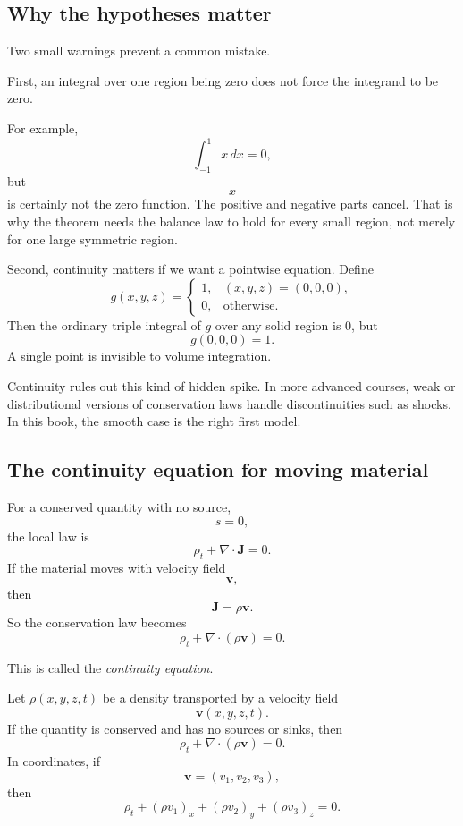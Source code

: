 \subsection{Why the hypotheses matter}

Two small warnings prevent a common mistake.

First, an integral over one region being zero does not force the integrand to be zero.

For example,
\[
    \int_{-1}^{1} x\,dx=0,
\]
but
\[
    x
\]
is certainly not the zero function.  The positive and negative parts cancel.  That is why
the theorem needs the balance law to hold for every small region, not merely for one
large symmetric region.

Second, continuity matters if we want a pointwise equation.  Define
\[
    g(x,y,z)=
    \begin{cases}
    1, & (x,y,z)=(0,0,0),\\
    0, & \text{otherwise}.
    \end{cases}
\]
Then the ordinary triple integral of \(g\) over any solid region is \(0\), but
\[
    g(0,0,0)=1.
\]
A single point is invisible to volume integration.

Continuity rules out this kind of hidden spike.  In more advanced courses, weak or
distributional versions of conservation laws handle discontinuities such as shocks.  In
this book, the smooth case is the right first model.

\subsection{The continuity equation for moving material}

For a conserved quantity with no source,
\[
    s=0,
\]
the local law is
\[
\boxed{
    \rho_t+\nabla\cdot\mathbf J=0.
}
\]
If the material moves with velocity field
\[
    \mathbf v,
\]
then
\[
    \mathbf J=\rho\mathbf v.
\]
So the conservation law becomes
\[
\boxed{
    \rho_t+\nabla\cdot(\rho\mathbf v)=0.
}
\]

This is called the \emph{continuity equation}.

\begin{definition}
Let \(\rho(x,y,z,t)\) be a density transported by a velocity field
\[
    \mathbf v(x,y,z,t).
\]
If the quantity is conserved and has no sources or sinks, then
\[
\boxed{
    \rho_t+\nabla\cdot(\rho\mathbf v)=0.
}
\]
In coordinates, if
\[
    \mathbf v=(v_1,v_2,v_3),
\]
then
\[
\boxed{
    \rho_t+(\rho v_1)_x+(\rho v_2)_y+(\rho v_3)_z=0.
}
\]
\end{definition}


